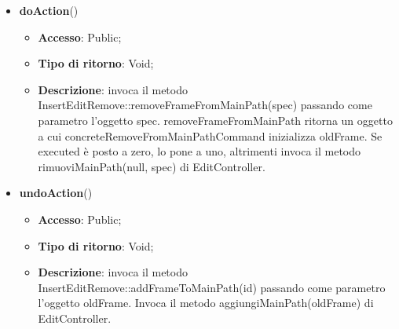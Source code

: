 {{{\begin{itemize}
					\begin{itemize}
						\item \textbf{Accesso}: Public;
						\item \textbf{Tipo di ritorno}: Void;
						\item \textbf{Descrizione}: costruisce l’oggetto concreteRemoveFromMainPathCommand.
					\end{itemize}
					\item \textbf{doAction}()
					\begin{itemize}
						\item \textbf{Accesso}: Public;
						\item \textbf{Tipo di ritorno}: Void;
						\item \textbf{Descrizione}: invoca il metodo InsertEditRemove::removeFrameFromMainPath(spec) passando come parametro l'oggetto spec.  removeFrameFromMainPath ritorna un oggetto a cui concreteRemoveFromMainPathCommand inizializza oldFrame. Se executed è posto a zero, lo pone a uno, altrimenti invoca il metodo rimuoviMainPath(null, spec) di EditController.
					\end{itemize}
					\item \textbf{undoAction}()
					\begin{itemize}
						\item \textbf{Accesso}: Public;
						\item \textbf{Tipo di ritorno}: Void;
						\item \textbf{Descrizione}: invoca il metodo InsertEditRemove::addFrameToMainPath(id) passando come parametro l'oggetto oldFrame. Invoca il metodo aggiungiMainPath(oldFrame) di EditController.
					\end{itemize}
				\end{itemize}
				}

}}
